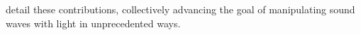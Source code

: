 detail these contributions, collectively advancing the goal of manipulating sound waves with light in unprecedented ways.






